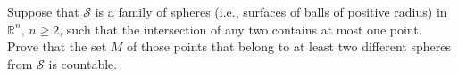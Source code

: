 \documentclass{article}
\begin{document}
	\setlength{\parindent}{0pt}
    Suppose that $\mathcal{S}$ is a family of spheres (i.e., surfaces of balls of positive radius) in $\mathbb{R}^n,\, n\geq2$, such that the intersection of any two contains at most one point. Prove that the set $M$ of those points that belong to at least two different spheres from $\mathcal{S}$ is countable.
\end{document}
